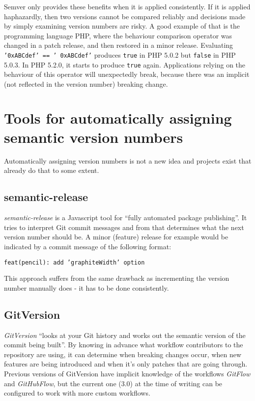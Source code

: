 \documentclass{l4proj}
\begin{document}
Semver only provides these benefits when it is applied consistently.
If it is applied haphazardly, then two versions cannot be compared
reliably and decisions made by simply examining version numbers are
risky. A good example of that is the programming language PHP, where
the behaviour comparison operator was changed in a patch release, and
then restored in a minor release. Evaluating \texttt{'0xABCdef' == '
0xABCdef'} produces \texttt{true} in PHP 5.0.2 but \texttt{false} in
PHP 5.0.3. In PHP 5.2.0, it starts to produce \texttt{true} again.
Applications relying on the behaviour of this operator will unexpectedly
break, because there was an implicit (not reflected in the version number)
breaking change.


\section{Tools for automatically assigning semantic version numbers}

Automatically assigning version numbers is not a new idea and projects
exist that already do that to some extent.

\subsection{semantic-release}

\textit{semantic-release}\cite{SemanticRelease} is a Javascript tool
for ``fully automated package publishing''. It tries to interpret Git
commit messages and from that determines what the next version number
should be. A minor (feature) release for example would be indicated by
a commit message of the following format:

\begin{center}
\texttt{feat(pencil): add 'graphiteWidth' option}
\end{center}

This approach suffers from the same drawback as incrementing the
version number manually does - it has to be done consistently.

\subsection{GitVersion}

\textit{GitVersion}\cite{GitVersion} ``looks at your Git history and
works out the semantic version of the commit being built''.  By
knowing in advance what workflow contributors to the repository are
using, it can determine when breaking changes occur, when new features
are being introduced and when it's only patches that are going
through. Previous versions of GitVersion have implicit knowledge of
the workflows \textit{GitFlow}\cite{GitFlow} and
\textit{GitHubFlow}\cite{GitHubFlow}, but the current one (3.0) at the
time of writing can be configured to work with more custom workflows.
\end{document}

